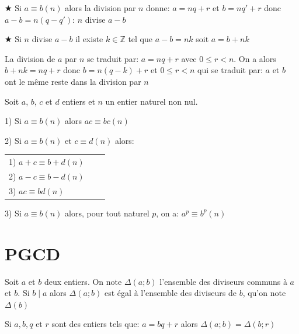 \documentclass[french]{book}
\begin{document}
\begin{demo}

  $\bigstar$ Si $a \equiv b \left( n\right) $ alors la division  par $n$ donne: $a=nq+r$ et $b=nq'+r$ donc $a-b=n(q-q')$: $n$ divise $a-b$
  
 $\bigstar$ Si $n$ divise $a-b$ il existe $k \in\mathbb{Z}$ tel que $a-b=nk$ soit $a=b+nk$
  
  La division de $a$ par $n$ se traduit par: $a=nq+r$ avec $0\leq r <n$. On a alors $b+nk=nq+r$ donc $b=n(q-k)+r$ et $0\leq r < n$ qui se traduit par: $a$ et $b$ ont le même reste dans la division par $n$

\end{demo}


\begin{prop}
Soit $a$, $b$, $c$ et $d$ entiers et $n$ un entier naturel non nul.

1) Si $a \equiv b \left( n\right) $ alors $ac \equiv bc \left( n\right) $

2) Si $a \equiv b \left( n\right) $ et $c \equiv d \left( n\right) $ alors:

\begin{tabular}[t]{lll}1) $a+c \equiv b+d \left( n\right) $\\2) $a-c \equiv b-d \left( n\right) $\\3) $ac \equiv bd \left( n\right) $
\end{tabular}

3) Si $a \equiv b \left( n\right) $ alors, pour tout naturel $p$, on a: $a^{p} \equiv b^{p} \left( n\right) $

\end{prop}

\section{PGCD}




\begin{defn}

Soit $a$ et $b$ deux entiers. On note $\Delta\left( a;b\right) $ l'ensemble des diviseurs communs à $a$ et $b$.
Si $b\mid a$ alors $\Delta\left( a;b\right) $ est égal à l'ensemble des diviseurs de $b$, qu'on note $\Delta\left( b\right) $

\end{defn}

\begin{prop}
Si $a, b, q$ et $r$ sont des entiers tels que: $a=bq+r$ alors $\Delta\left( a;b\right)=\Delta\left( b;r\right)  $
 \end{prop}
 
\end{document}
